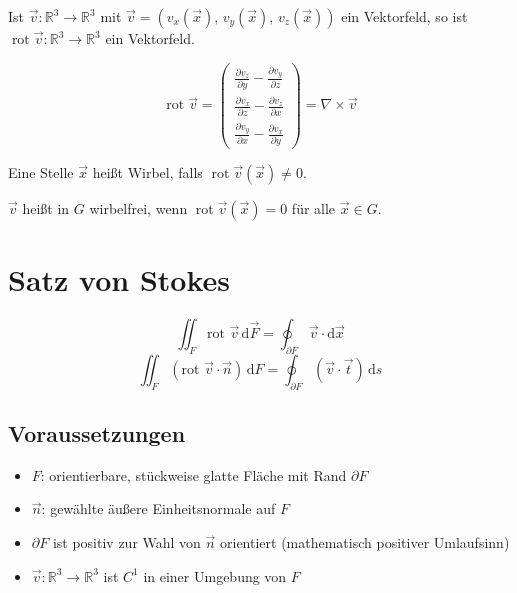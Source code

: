 \documentclass[a4paper,11pt,oneside,open=any,parskip=half, DIV=15]{scrreprt}
\begin{document}
   Ist \(\vec{v}:\mathbb{R}^3\to\mathbb{R}^3\) mit
   \(\vec{v}=(v_x(\vec{x}),\,v_y(\vec{x}),\,v_z(\vec{x}))\) ein Vektorfeld,
   so ist \(\operatorname{rot}\vec{v}:\mathbb{R}^3\to\mathbb{R}^3\) ein Vektorfeld.

   \begin{importantbox}
      \[
         \operatorname{rot}\vec{v}
         =\begin{pmatrix}
            \frac{\partial v_z}{\partial y}-\frac{\partial v_y}{\partial z}\\[6pt]
            \frac{\partial v_x}{\partial z}-\frac{\partial v_z}{\partial x}\\[6pt]
            \frac{\partial v_y}{\partial x}-\frac{\partial v_x}{\partial y}
         \end{pmatrix}
         =\nabla\times\vec{v}
      \]
   \end{importantbox}

   Eine Stelle \(\vec{x}\) heißt Wirbel, falls \(\operatorname{rot}\vec{v}(\vec{x})\neq 0\).

   \(\vec{v}\) heißt in \(G\) wirbelfrei, wenn \(\operatorname{rot}\vec{v}(\vec{x})=0\) für alle \(\vec{x}\in G\).

\section{Satz von Stokes}

   \begin{importantbox}
      \[
         \iint_F \text{rot } \vec{v} \, \mathrm{d}\vec{F} = \oint_{\partial F} \vec{v} \cdot \mathrm{d} \vec{x}
      \]
      \[
         \iint_F (\text{rot } \vec{v} \cdot \vec n) \, \mathrm{d}F  = \oint_{\partial F} (\vec{v} \cdot \vec{t}) \, \mathrm{d}s
      \]
   \end{importantbox}

   \subsection*{Voraussetzungen}

      \begin{itemize}
         \item \(F\): orientierbare, stückweise glatte Fläche mit Rand \(\partial F\)
         \item \(\vec{n}\): gewählte äußere Einheitsnormale auf \(F\)
         \item \(\partial F\) ist positiv zur Wahl von \(\vec{n}\) orientiert (mathematisch positiver Umlaufsinn)
         \item \(\vec{v} : \mathbb{R}^3 \to \mathbb{R}^3\) ist \(C^1\) in einer Umgebung von \(F\)
      \end{itemize}
\end{document}
